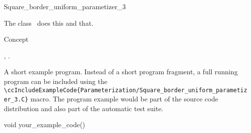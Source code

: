 

\begin{ccRefClass}{Square_border_uniform_parametizer_3}  %


\ccDefinition
  
The class \ccRefName\ does this and that.


\ccIsModel

Concept

\ccTypes


\ccCreation
{}  %


\ccOperations


\ccSeeAlso

,
.

\ccExample

A short example program.
Instead of a short program fragment, a full running program can be
included using the 
\verb|\ccIncludeExampleCode{Parameterization/Square_border_uniform_parametizer_3.C}| 
macro. The program example would be part of the source code distribution and
also part of the automatic test suite.

\begin{ccExampleCode}
void your_example_code() {
}
\end{ccExampleCode}


\end{ccRefClass}


